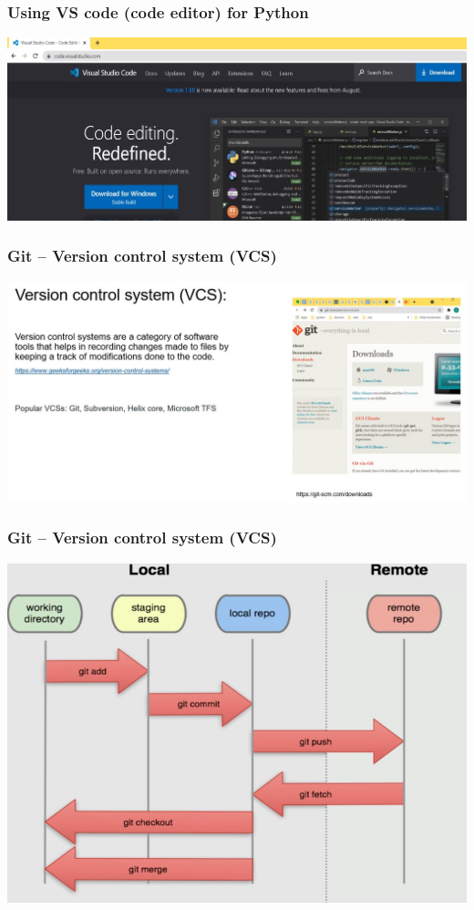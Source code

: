 \documentclass{beamer}
\begin{document}
\begin{frame}
    \frametitle{Using VS code (code editor) for Python}
    \centering
    \includegraphics[scale = 0.5]{figures/vscode.jpg}
\end{frame}

\begin{frame}
    \frametitle{Git – Version control system (VCS)}
    \centering
    \includegraphics[scale = 0.35]{figures/git.jpg}
\end{frame}

\begin{frame}
    \frametitle{Git – Version control system (VCS)}
    \centering
    \includegraphics[scale = 0.5]{figures/git_flow.jpg}
\end{frame}
\end{document}

